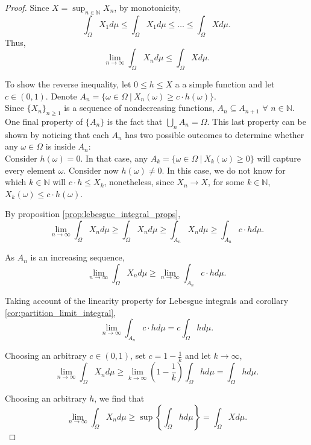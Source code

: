 \documentclass[../TGMAFFIRO.tex]{subfiles}
\begin{document}
\begin{proof}
	Since $X = \sup_{n\in \mathbb{N}}X_n$, by monotonicity,
	\begin{equation*}
		\int_\Omega X_1 d\mu \leq \int_\Omega X_1 d\mu \leq \ldots \leq \int_\Omega X d\mu.
	\end{equation*}
	Thus,
	\begin{equation*}
		\lim_{n\to\infty}\int_\Omega X_n d\mu \leq \int_\Omega X d\mu.
	\end{equation*}
	
	To show the reverse inequality, let $0 \leq h \leq X$ a a simple function and let $c \in (0,1)$. Denote $A_n = \{\omega\in\Omega \ | \ X_n(\omega) \geq c\cdot h(\omega)\}$.\\
	
	Since $\{X_n\}_{n\geq 1}$ is a sequence of nondecreasing functions, $A_n \subseteq A_{n+1}$ $\forall$  $n\in\mathbb{N}$. One final property of $\{A_n\}$ is the fact that $\bigcup_nA_n = \Omega$.	This last property can be shown by noticing that each $A_n$ has two possible outcomes to determine whether any $\omega\in\Omega$ is inside $A_n$:\\
	
	Consider $h(\omega)=0$. In that case, any $A_k = \{\omega\in\Omega \ | \  X_k(\omega) \geq 0\}$ will capture every element $\omega$. Consider now $h(\omega) \neq 0$. In this case, we do not know for which $k\in\mathbb{N}$ will $c\cdot h \leq X_k$, nonetheless, since $X_n \to X$, for some $k\in\mathbb N$, $X_k(\omega) \leq c\cdot h(\omega)$.
	
	By proposition \ref{prop:lebesgue_integral_props},
	\begin{equation}
		\lim_{n\to\infty}\int_\Omega X_n d\mu \geq \int_\Omega X_n d\mu \geq \int_{A_n} X_n d\mu \geq \int_{A_n} c\cdot h d\mu.
	\end{equation}
	
	As $A_n$ is an increasing sequence,
	\begin{equation}
		\lim_{n\to\infty}\int_\Omega X_n d\mu \geq \lim_{n\to\infty}\int_{A_n} c\cdot h d\mu.
	\end{equation}
	
	Taking account of the linearity property for Lebesgue integrals and corollary \ref{cor:partition_limit_integral},
	\begin{equation}
  		\lim_{n\to\infty}\int_{A_n} c\cdot h d\mu = c\int_{\Omega} h d\mu.
	\end{equation}
	
	Choosing an arbitrary $c \in (0,1)$, set $c= 1 - \frac{1}{k}$ and let $k\to\infty$,
	\begin{equation}
  		\lim_{n\to\infty}\int_\Omega X_n d\mu \geq \lim_{k\to\infty} \left(1 - \frac{1}{k}\right)\int_{\Omega} h d\mu = \int_{\Omega} h d\mu.
	\end{equation}
	
	Choosing an arbitrary $h$, we find that
	\begin{equation}
  		\lim_{n\to\infty}\int_\Omega X_n d\mu \geq \sup\left\{\int_{\Omega} h d\mu\right\} = \int_\Omega X d\mu.
	\end{equation}
\end{proof}
\end{document}
